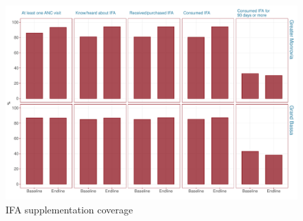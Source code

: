 \documentclass[12pt,a4paper]{article}
\begin{document}
\begin{figure}[H]

{\centering \includegraphics{liberiaCoverageFinalReport_files/figure-latex/ifa1plot-1} 

}

\caption{IFA supplementation coverage}\label{fig:ifa1plot}
\end{figure}
\end{document}
